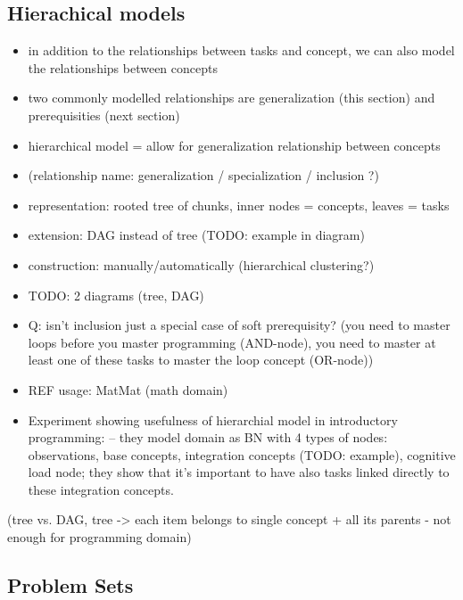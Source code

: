 \subsection{Hierachical models}

\begin{itemize}
\item in addition to the relationships between tasks and concept,
  we can also model the relationships between concepts
\item two commonly modelled relationships are generalization (this section) and
  prerequisities (next section)
\item hierarchical model = allow for generalization relationship between concepts
\item (relationship name: generalization / specialization / inclusion ?)
\item representation: rooted tree of chunks, inner nodes = concepts, leaves = tasks
\item extension: DAG instead of tree (TODO: example in diagram)
\item construction: manually/automatically (hierarchical clustering?)
\item TODO: 2 diagrams (tree, DAG)
\item Q: isn't inclusion just a special case of soft prerequisity?
  (you need to master loops before you master programming (AND-node),
    you need to master at least one of these tasks to master the loop concept (OR-node))
\item REF usage: MatMat (math domain)
\item Experiment showing usefulness of hierarchial model in introductory programming:
  \cite{learner-models-integration-skills} -- they model domain as BN with 4
    types of nodes: observations, base concepts, integration concepts (TODO:
    example), cognitive load node; they show that it's important to have also
    tasks linked directly to these integration concepts.
\end{itemize}



    (tree vs. DAG, tree -> each  item belongs to single concept + all its parents - not enough for programming domain)



\subsection{Problem Sets}

